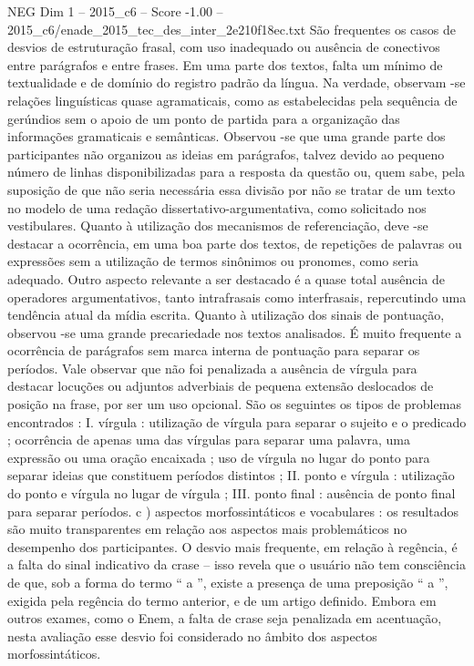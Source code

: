 \begin{textsample}{NEG Dim 1 – 2015\_c6 – Score -1.00 – 2015\_c6/enade\_2015\_tec\_des\_inter\_2e210f18ec.txt}
São frequentes os casos de desvios de estruturação frasal, com uso inadequado ou ausência de conectivos entre parágrafos e entre frases.
Em uma parte dos textos, falta um mínimo de textualidade e de domínio do registro padrão da língua.
Na verdade, observam -se relações linguísticas quase agramaticais, como as estabelecidas pela sequência de gerúndios sem o apoio de um ponto de partida para a organização das informações gramaticais e semânticas.
Observou -se que uma grande parte dos participantes não organizou as ideias em parágrafos, talvez devido ao pequeno número de linhas disponibilizadas para a resposta da questão ou, quem sabe, pela suposição de que não seria necessária essa divisão por não se tratar de um texto no modelo de uma redação dissertativo-argumentativa, como solicitado nos vestibulares.
Quanto à utilização dos mecanismos de referenciação, deve -se destacar a ocorrência, em uma boa parte dos textos, de repetições de palavras ou expressões sem a utilização de termos sinônimos ou pronomes, como seria adequado.
Outro aspecto relevante a ser destacado é a quase total ausência de operadores argumentativos, tanto intrafrasais como interfrasais, repercutindo uma tendência atual da mídia escrita.
Quanto à utilização dos sinais de pontuação, observou -se uma grande precariedade nos textos analisados.
É muito frequente a ocorrência de parágrafos sem marca interna de pontuação para separar os períodos.
Vale observar que não foi penalizada a ausência de vírgula para destacar locuções ou adjuntos adverbiais de pequena extensão deslocados de posição na frase, por ser um uso opcional.
São os seguintes os tipos de problemas encontrados : I. vírgula : utilização de vírgula para separar o sujeito e o predicado ; ocorrência de apenas uma das vírgulas para separar uma palavra, uma expressão ou uma oração encaixada ; uso de vírgula no lugar do ponto para separar ideias que constituem períodos distintos ; II. ponto e vírgula : utilização do ponto e vírgula no lugar de vírgula ; III. ponto final : ausência de ponto final para separar períodos. c ) aspectos morfossintáticos e vocabulares : os resultados são muito transparentes em relação aos aspectos mais problemáticos no desempenho dos participantes.
O desvio mais frequente, em relação à regência, é a falta do sinal indicativo da crase – isso revela que o usuário não tem consciência de que, sob a forma do termo “ a ”, existe a presença de uma preposição “ a ”, exigida pela regência do termo anterior, e de um artigo definido.
Embora em outros exames, como o Enem, a falta de crase seja penalizada em acentuação, nesta avaliação esse desvio foi considerado no âmbito dos aspectos morfossintáticos.

\end{textsample}
